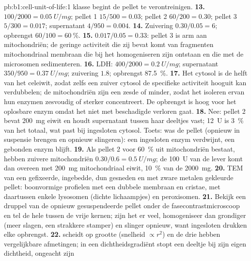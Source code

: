 \begin{solution}{pb:b1:cell-unit-of-life:1}
klasse begint de pellet te verontreinigen.
\textbf{13.}  $100/2000 = \qty{0.05}{U/mg}$; pellet 1
$15/500 = 0.03$; pellet 2 $60/200 = 0.30$; pellet 3 $5/300 = 0.017$;
supernatant $4/950 = 0.004$.
\textbf{14.} Zuivering $0.30/0.05 = 6$; opbrengst $60/100 =
\qty{60}{\%}$.
\textbf{15.} $0.017/0.05 = 0.33$: pellet 3 is arm aan mitochondriën; de geringe activiteit die zij bevat komt van fragmenten mitochondriaal membraan die bij het homogeniseren zijn ontstaan en die met de microsomen sedimenteren.
\textbf{16.} LDH:  $400/2000 = \qty{0.2}{U/mg}$; supernatant
$350/950 = \qty{0.37}{U/mg}$; zuivering $1.8$; opbrengst \qty{87.5}{\%}.
\textbf{17.} Het cytosol is de helft van het celeiwit, zodat zelfs een zuiver
cytosol de specifieke activiteit hooguit kan verdubbelen; de mitochondriën zijn
een zesde of minder, zodat het isoleren ervan hun enzymen zesvoudig of sterker
concentreert. De opbrengst is hoog voor het oplosbare enzym omdat het niet met
beschadigde  verloren gaat.
\textbf{18.} Nee: pellet 2 bevat \qty{200}{mg} eiwit en houdt supernatant tussen
haar deeltjes vast; \qty{12}{U} is \qty{3}{\%} van het totaal, wat past bij
ingesloten cytosol. Toets: was de pellet (opnieuw in suspensie brengen en
opnieuw slingeren): een ingesloten enzym verdwijnt, een gebonden enzym blijft.
\textbf{19.} Als pellet 2 voor \qty{60}{\%} uit mitochondriën bestaat, hebben
zuivere mitochondriën $0.30/0.6 = \qty{0.5}{U/mg}$; de \qty{100}{U} van de lever
komt dan overeen met \qty{200}{mg} mitochondriaal eiwit, \qty{10}{\%} van de
\qty{2000}{mg}.
\textbf{20.} TEM van een gefixeerde, ingebedde, dun gesneden en met zware metalen
gekleurde pellet: boonvormige profielen met een dubbele membraan en cristae, met
daartussen enkele lysosomen (dichte lichaampjes) en peroxisomen.
\textbf{21.} Bekijk een druppel van de opnieuw gesuspendeerde pellet onder de fasecontrastmicroscoop en tel de hele  tussen de vrije kernen; zijn het er veel, homogeniseer dan grondiger (meer slagen, een strakkere stamper) en slinger opnieuw, want ingesloten  drukken elke opbrengst.
\textbf{22.}  scheidt op grootte (snelheid
$\propto r^2$) en de drie  hebben vergelijkbare afmetingen; in een
dichtheidsgradiënt stopt een deeltje bij zijn eigen dichtheid, ongeacht zijn

\end{solution}
